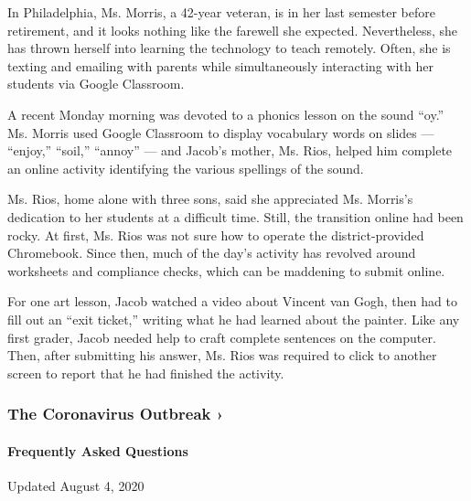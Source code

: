 In Philadelphia, Ms. Morris, a 42-year veteran, is in her last semester
before retirement, and it looks nothing like the farewell she expected.
Nevertheless, she has thrown herself into learning the technology to
teach remotely. Often, she is texting and emailing with parents while
simultaneously interacting with her students via Google Classroom.

A recent Monday morning was devoted to a phonics lesson on the sound
``oy.'' Ms. Morris used Google Classroom to display vocabulary words on
slides --- ``enjoy,'' ``soil,'' ``annoy'' --- and Jacob's mother, Ms.
Rios, helped him complete an online activity identifying the various
spellings of the sound.

Ms. Rios, home alone with three sons, said she appreciated Ms. Morris's
dedication to her students at a difficult time. Still, the transition
online had been rocky. At first, Ms. Rios was not sure how to operate
the district-provided Chromebook. Since then, much of the day's activity
has revolved around worksheets and compliance checks, which can be
maddening to submit online.

For one art lesson, Jacob watched a video about Vincent van Gogh, then
had to fill out an ``exit ticket,'' writing what he had learned about
the painter. Like any first grader, Jacob needed help to craft complete
sentences on the computer. Then, after submitting his answer, Ms. Rios
was required to click to another screen to report that he had finished
the activity.

\href{https://www.nytimes.com/news-event/coronavirus?action=click\&pgtype=Article\&state=default\&region=MAIN_CONTENT_3\&context=storylines_faq}{}

\hypertarget{the-coronavirus-outbreak-}{%
\subsubsection{The Coronavirus Outbreak
›}\label{the-coronavirus-outbreak-}}

\hypertarget{frequently-asked-questions}{%
\paragraph{Frequently Asked
Questions}\label{frequently-asked-questions}}

Updated August 4, 2020


